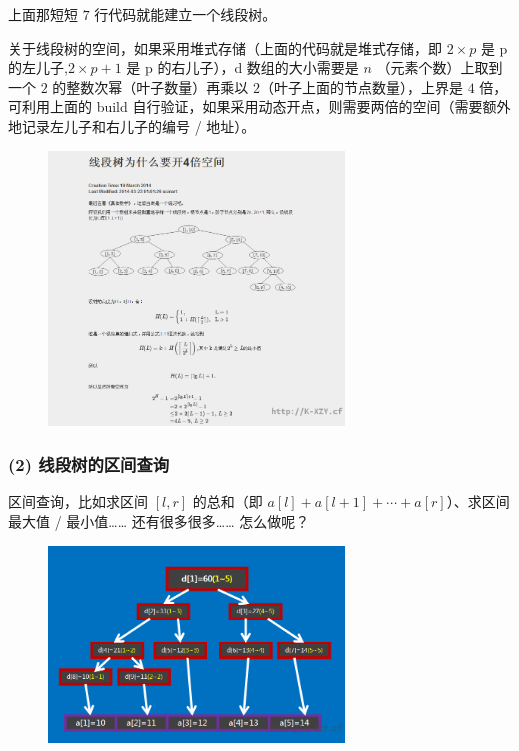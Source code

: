 上面那短短 $7$ 行代码就能建立一个线段树。

关于线段树的空间，如果采用堆式存储（上面的代码就是堆式存储，即 $2\times p$ 是 p 的左儿子,$2 \times p+1$ 是 p 的右儿子），d 数组的大小需要是 $n$ （元素个数）上取到一个 $2$ 的整数次幂（叶子数量）再乘以 $2$（叶子上面的节点数量），上界是 $4$ 倍，可利用上面的 build 自行验证，如果采用动态开点，则需要两倍的空间（需要额外地记录左儿子和右儿子的编号 / 地址）。

\begin{figure}[htbp]
\centering
\includegraphics[width=0.7\textwidth]{docs/ds/images/segt5.png} 

\end{figure}

\subsubsection{(2) 线段树的区间查询}

区间查询，比如求区间 $[l,r]$ 的总和（即 $a[l]+a[l+1]+ \cdots +a[r]$）、求区间最大值 / 最小值…… 还有很多很多…… 怎么做呢？

\begin{figure}[htbp]
\centering
\includegraphics[width=0.7\textwidth]{docs/ds/images/segt6.png} 

\end{figure}

